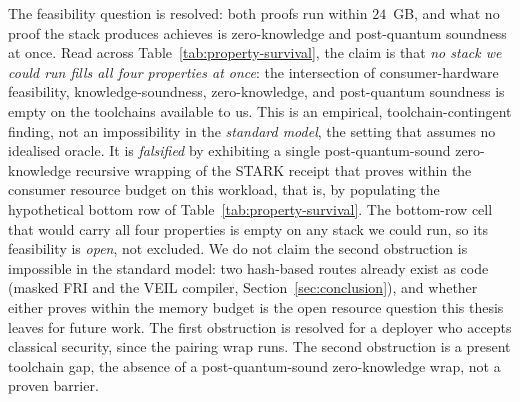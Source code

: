 \begin{proposition}
    The feasibility question is resolved: both proofs run within $24$~GB, and what no proof the stack produces achieves is zero-knowledge and post-quantum soundness at once. Read across Table~\ref{tab:property-survival}, the claim is that \emph{no stack we could run fills all four properties at once}: the intersection of consumer-hardware feasibility, knowledge-soundness, zero-knowledge, and post-quantum soundness is empty on the toolchains available to us. This is an empirical, toolchain-contingent finding, not an impossibility in the \emph{standard model}, the setting that assumes no idealised oracle. It is \emph{falsified} by exhibiting a single post-quantum-sound zero-knowledge recursive wrapping of the STARK receipt that proves within the consumer resource budget on this workload, that is, by populating the hypothetical bottom row of Table~\ref{tab:property-survival}. The bottom-row cell that would carry all four properties is empty on any stack we could run, so its feasibility is \emph{open}, not excluded. We do not claim the second obstruction is impossible in the standard model: two hash-based routes already exist as code (masked FRI and the VEIL compiler, Section~\ref{sec:conclusion}), and whether either proves within the memory budget is the open resource question this thesis leaves for future work. The first obstruction is resolved for a deployer who accepts classical security, since the pairing wrap runs. The second obstruction is a present toolchain gap, the absence of a post-quantum-sound zero-knowledge wrap, not a proven barrier.
\end{proposition}

